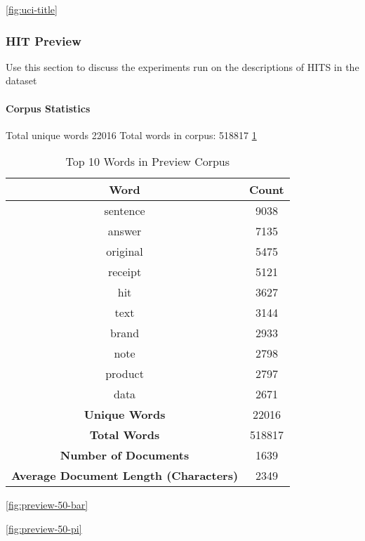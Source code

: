 \documentclass[letterpaper,12pt]{article}
\begin{document}
\ref{fig:uci-title}

\newpage
\subsubsection{HIT Preview}
Use this section to discuss the experiments run on the descriptions of HITS in the dataset

\paragraph{Corpus Statistics}
Total unique words 22016
Total words in corpus: 518817
\ref{tab:preview_top_words}

\begin{table}
	\caption{\label{tab:preview_top_words} Top 10 Words in Preview Corpus}
	\begin{center}
		\begin{tabular}{|c|c|}
			\hline
			\textbf{Word} & \textbf{Count} \\
			\hline
			sentence & 9038 \\
			\hline
			answer & 7135 \\
			\hline
			original & 5475 \\
			\hline
			receipt & 5121 \\
			\hline
			hit & 3627 \\
			\hline
			text & 3144 \\
			\hline
			brand & 2933 \\
			\hline
			note & 2798 \\
			\hline
			product & 2797 \\
			\hline
			data & 2671 \\
			\hline
			\textbf{Unique Words} & 22016 \\
			\hline
			\textbf{Total Words} & 518817 \\
			\hline
			\textbf{Number of Documents} & 1639 \\
			\hline
			\textbf{Average Document Length (Characters)} & 2349 \\
			\hline
		\end{tabular}
	\end{center}
\end{table}

\ref{fig:preview-50-bar}

\ref{fig:preview-50-pi}
\end{document}
